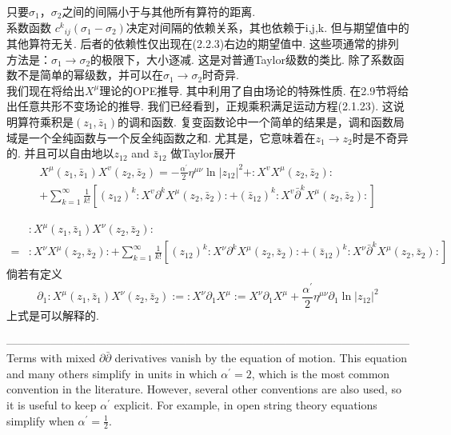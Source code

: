 只要$\sigma_{1}$，$\sigma_{2}$之间的间隔小于与其他所有算符的距离.\\
系数函数 $c^{k}{ }_{i j}\left(\sigma_{1}-\sigma_{2}\right)$决定对间隔的依赖关系，其也依赖于i,j,k. 但与期望值中的其他算符无关. 后者的依赖性仅出现在(2.2.3)右边的期望值中. 这些项通常的排列方法是：$\sigma_{1} \rightarrow \sigma_{2}$的极限下，大小逐减. 这是对普通Taylor级数的类比. 除了系数函数不是简单的幂级数，并可以在$\sigma_{1} \rightarrow \sigma_{2}$时奇异.\\
我们现在将给出$X^\mu$理论的OPE推导. 其中利用了自由场论的特殊性质. 在2.9节将给出任意共形不变场论的推导. 我们已经看到，正规乘积满足运动方程(2.1.23). 这说明算符乘积是$\left(z_{1}, \bar{z}_{1}\right)$的调和函数. 复变函数论中一个简单的结果是，调和函数局域是一个全纯函数与一个反全纯函数之和. 尤其是，它意味着在$z_{1} \rightarrow z_{2}$时是不奇异的. 并且可以自由地以$z_{12}$ and $\bar{z}_{12}$ 做Taylor展开
\begin{equation}
\begin{array}{l}
X^{\mu}\left(z_{1}, \bar{z}_{1}\right) X^{v}\left(z_{2}, \bar{z}_{2}\right)=-\frac{\alpha^{\prime}}{2} \eta^{\mu \nu} \ln \left|z_{12}\right|^{2}+: X^{v} X^{\mu}\left(z_{2}, \bar{z}_{2}\right): \\
+\sum_{k=1}^{\infty} \frac{1}{k !}\left[\left(z_{12}\right)^{k}: X^{v} \partial^{k} X^{\mu}\left(z_{2}, \bar{z}_{2}\right):+\left(\bar{z}_{12}\right)^{k}: X^{v} \bar{\partial}^{k} X^{\mu}\left(z_{2}, \bar{z}_{2}\right):\right]
\end{array}
\end{equation}
\begin{remark}
$$\begin{aligned}
&:X^{\mu}\left(z_{1},  \bar{z}_{1}\right) X^{\nu}\left(z_{2}, \bar{z}_{2}\right):\\
=&: X^{\nu} X^{\mu}\left(z_{2}, \bar{z}_{2}\right):+\sum_{k=1}^{\infty} \frac{1}{k !}\left[\left(z_{12}\right)^{k}: X^{\nu} \partial^{k} X^{\mu}\left(z_{2}, \bar{z}_{2}\right):+\left(\bar{z}_{12}\right)^{k}:X^{\nu} \bar{\partial}^{k} X^{\mu}\left(z_{2}, \bar{z}_{2}\right):\right]
\end{aligned}
$$
倘若有定义
$$\partial_{1}:X^{\mu}\left(z_{1}, \bar{z}_{1}\right) X^{\nu}\left(z_{2}, \bar{z}_{2}\right):=: X^{\nu} \partial_{1}X^{\mu}:=X^{\nu} \partial_1 X^{\mu}+\frac{\alpha^{\prime}}{2} \eta^{\mu \nu} \partial_{1} \ln |z_{12}|^{2}$$
上式是可以解释的.
\end{remark}
------------------------------------------------------------------------------------------------------------
\\
Terms with mixed $\partial \bar{\partial}$ derivatives vanish by the equation of motion. This equation and many others simplify in units in which $\alpha^{\prime}=2$, which is the most common convention in the literature. However, several other conventions are also used, so it is useful to keep $\alpha^{\prime}$ explicit. For example, in open string theory equations simplify when $\alpha^{\prime}=\frac{1}{2}$.

